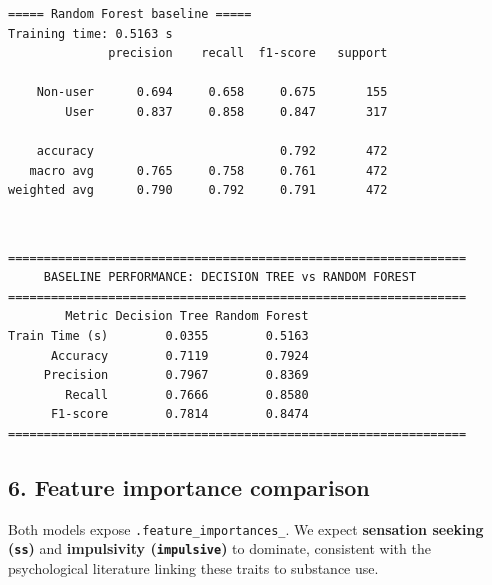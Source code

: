 \documentclass[11pt]{article}
\begin{document}
    \begin{Verbatim}[commandchars=\\\{\}]
===== Random Forest baseline =====
Training time: 0.5163 s
              precision    recall  f1-score   support

    Non-user      0.694     0.658     0.675       155
        User      0.837     0.858     0.847       317

    accuracy                          0.792       472
   macro avg      0.765     0.758     0.761       472
weighted avg      0.790     0.792     0.791       472

    \end{Verbatim}

    \begin{center}
    \end{center}
    { \hspace*{\fill} \\}
    
    \begin{Verbatim}[commandchars=\\\{\}]
================================================================
     BASELINE PERFORMANCE: DECISION TREE vs RANDOM FOREST
================================================================
        Metric Decision Tree Random Forest
Train Time (s)        0.0355        0.5163
      Accuracy        0.7119        0.7924
     Precision        0.7967        0.8369
        Recall        0.7666        0.8580
      F1-score        0.7814        0.8474
================================================================
    \end{Verbatim}

    \subsection{6. Feature importance
comparison}\label{feature-importance-comparison}

Both models expose \texttt{.feature\_importances\_}. We expect
\textbf{sensation seeking (\texttt{ss})} and \textbf{impulsivity
(\texttt{impulsive})} to dominate, consistent with the psychological
literature linking these traits to substance use.
\end{document}
